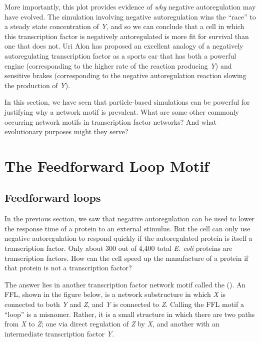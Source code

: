 More importantly, this plot provides evidence of \textit{why} negative autoregulation may have evolved. The simulation involving negative autoregulation wins the ``race'' to a steady state concentration of \textit{Y}, and so we can conclude that a cell in which this transcription factor is negatively autoregulated is more fit for survival than one that does not. Uri Alon has proposed an excellent analogy of a negatively autoregulating transcription factor as a sports car that has both a powerful engine (corresponding to the higher rate of the reaction producing \textit{Y}) and sensitive brakes (corresponding to the negative autoregulation reaction slowing the production of \textit{Y}).

In this section, we have seen that particle-based simulations can be powerful for justifying why a network motif is prevalent. What are some other commonly occurring network motifs in transcription factor networks? And what evolutionary purposes might they serve?


\FloatBarrier
{}

\section{The Feedforward Loop Motif}
\label{sec:the_feedforward_loop_motif}

\subsection{Feedforward loops}

In the previous section, we saw that negative autoregulation can be used to lower the response time of a protein to an external stimulus. But the cell can only use negative autoregulation to respond quickly if the autoregulated protein is itself a transcription factor. Only about 300 out of 4,400 total \textit{E. coli} proteins are transcription factors. How can the cell speed up the manufacture of a protein if that protein is not a transcription factor?

The answer lies in another transcription factor network motif called the  (). An FFL, shown in the figure below, is a network substructure in which \textit{X} is connected to both \textit{Y} and \textit{Z}, and \textit{Y} is connected to \textit{Z}. Calling the FFL motif a ``loop'' is a misnomer. Rather, it is a small structure in which there are two paths from \textit{X} to \textit{Z}; one via direct regulation of \textit{Z} by \textit{X}, and another with an intermediate transcription factor \textit{Y}.

